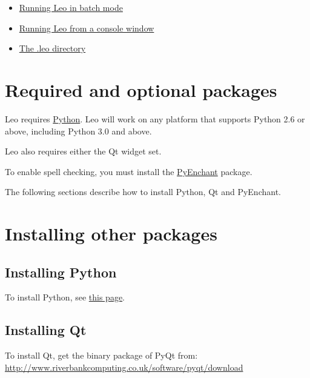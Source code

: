 \documentclass[a4paper,10pt,english]{sphinxmanual}
\begin{document}
{\begin{minipage}{0.95\linewidth}
\begin{itemize}
\begin{itemize}
\begin{itemize}
\item {} 
{\hyperref[installing:running-leo-in-batch-mode]{Running Leo in batch mode}}

\item {} 
{\hyperref[installing:running-leo-from-a-console-window]{Running Leo from a console window}}

\item {} 
{\hyperref[installing:the-leo-directory]{The .leo directory}}

\end{itemize}

\end{itemize}

\end{itemize}
\end{minipage}}
\begin{center}\setlength{\fboxsep}{5pt}\end{center}
\label{installing:running-leo}\label{installing:run-leo}

\section{Required and optional packages}
\label{installing:required-and-optional-packages}\label{installing:python}
Leo requires \href{http://www.python.org}{Python}. Leo will work on any platform that supports Python 2.6 or
above, including Python 3.0 and above.

Leo also requires either the Qt widget set.

To enable spell checking, you must install the \href{https://sourceforge.net/projects/pyenchant/}{PyEnchant} package.

The following sections describe how to install Python, Qt and PyEnchant.


\section{Installing other packages}
\label{installing:installing-other-packages}

\subsection{Installing Python}
\label{installing:installing-python}
To install Python, see \href{http://python.org}{this page}.


\subsection{Installing Qt}
\label{installing:installing-qt}
To install Qt, get the binary package of PyQt from:
\href{http://www.riverbankcomputing.co.uk/software/pyqt/download}{http://www.riverbankcomputing.co.uk/software/pyqt/download}
\end{document}

